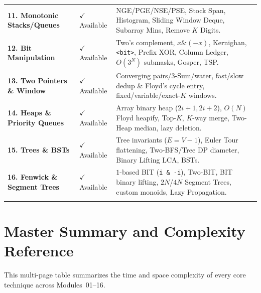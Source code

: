 \documentclass[11pt,a4paper]{article}
\begin{document}
\begin{tabularx}{\textwidth}{>{\raggedright\arraybackslash\bfseries}p{4.2cm} >{\centering\arraybackslash}p{1.9cm} >{\raggedright\arraybackslash}X}
11. Monotonic Stacks/Queues & \color{codegreen}$\checkmark$ Available & NGE/PGE/NSE/PSE, Stock Span, Histogram, Sliding Window Deque, Subarray Mins, Remove $K$ Digits. \\
12. Bit Manipulation & \color{codegreen}$\checkmark$ Available & Two's complement, $x \mathbin{\&} (-x)$, Kernighan, \texttt{<bit>}, Prefix XOR, Column Ledger, $O(3^N)$ submasks, Gosper, TSP. \\
13. Two Pointers \& Window & \color{codegreen}$\checkmark$ Available & Converging pairs/3-Sum/water, fast/slow dedup \& Floyd's cycle entry, fixed/variable/exact-$K$ windows. \\
14. Heaps \& Priority Queues & \color{codegreen}$\checkmark$ Available & Array binary heap ($2i{+}1, 2i{+}2$), $O(N)$ Floyd heapify, Top-$K$, $K$-way merge, Two-Heap median, lazy deletion. \\
15. Trees \& BSTs & \color{codegreen}$\checkmark$ Available & Tree invariants ($E=V{-}1$), Euler Tour flattening, Two-BFS/Tree DP diameter, Binary Lifting LCA, BSTs. \\
16. Fenwick \& Segment Trees & \color{codegreen}$\checkmark$ Available & $1$-based BIT (\texttt{i \& -i}), Two-BIT, BIT binary lifting, $2N$/$4N$ Segment Trees, custom monoids, Lazy Propagation. \\
\arrayrulecolor{primaryblue}\bottomrule[1.2pt]
\end{tabularx}\endgroup

\section{Master Summary and Complexity Reference}

This multi-page table summarizes the time and space complexity of every core technique across Modules~01--16.
\end{document}
